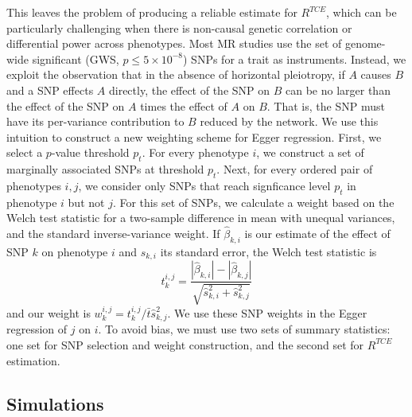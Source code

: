 \documentclass{article}
\begin{document}
This leaves the problem of producing a reliable estimate for $R^{TCE}$,
which can be particularly challenging when there is non-causal genetic correlation or
differential power across phenotypes. Most MR studies use the set of
genome-wide significant (GWS, $p \le 5\times 10^{-8}$) SNPs for a trait as instruments.
Instead, we exploit the observation that in the absence of horizontal pleiotropy, 
if $A$ causes $B$ and a SNP effects $A$ directly,
the effect of the SNP on $B$ can be no larger than the effect of the SNP on $A$ times
the effect of $A$ on $B$. That is, the SNP must have its per-variance contribution to
$B$ reduced by the network. We use this intuition to construct a new
weighting scheme for Egger regression.
First, we select a $p$-value threshold $p_t$. For every phenotype $i$, we
 construct a set of marginally associated SNPs at threshold $p_t$. Next,
 for every ordered pair of phenotypes $i, j$, we consider only SNPs that reach
 signficance level $p_t$ in phenotype $i$ but not $j$. For this set of SNPs, we calculate
 a weight based on the Welch test statistic for a two-sample difference in mean with unequal
 variances,
 and the standard inverse-variance weight. If $\hat{\beta}_{k, i}$ is our estimate
 of the effect of SNP $k$ on phenotype $i$ and $\hat{s}_{k, i}$ its standard error,
 the Welch test statistic is~\cite{Welch1947}
\begin{equation}
t^{i,j}_k = \frac{|\hat{\beta}_{k, i}| - |\hat{\beta}_{k, j}|}
  {\sqrt{\hat{s}^2_{k, i} + \hat{s}^2_{k, j}}}
\end{equation}
and our weight is $w^{i, j}_k = t^{i,j}_k/\bar{t} \hat{s}_{k, j}^2$.
We use these SNP weights in the Egger regression of $j$ on $i$.
To avoid bias, we must use two sets of summary
statistics: one set for SNP selection and weight construction,
 and the second set for $R^{TCE}$ estimation.


\subsection*{Simulations}
\end{document}
